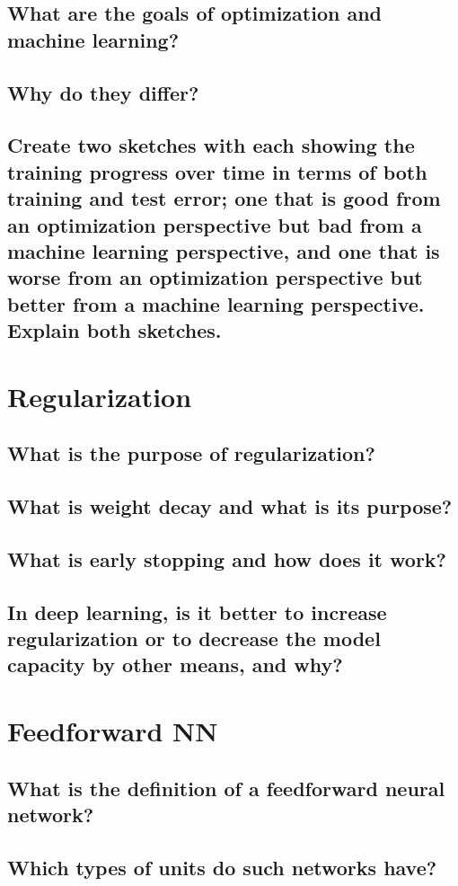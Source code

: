 \subsection{What are the goals of optimization and machine learning?}
\subsection{Why do they differ?}
\subsection{Create two sketches with each showing the training progress over time in terms of both training and test error; one that is good from an optimization perspective but bad from a machine learning perspective, and one that is worse from an optimization perspective but better from a machine learning perspective. Explain both sketches.}

\section{Regularization}
\subsection{What is the purpose of regularization?}
\subsection{What is weight decay and what is its purpose?}
\subsection{What is early stopping and how does it work?}
\subsection{In deep learning, is it better to increase regularization or to decrease the model capacity by other means, and why?}

\section{Feedforward NN}
\subsection{What is the definition of a feedforward neural network?}
\subsection{Which types of units do such networks have?}
